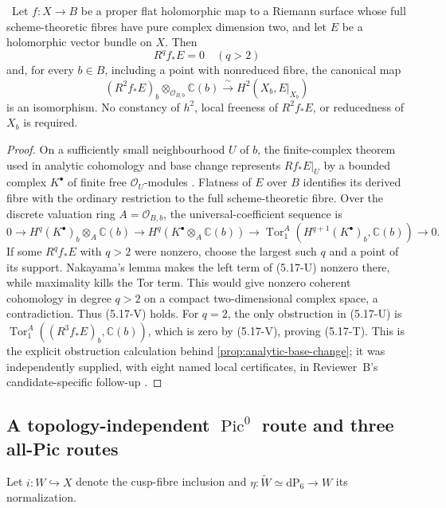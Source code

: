 \begin{corollary}
\label{cor:surface-top-base-change}
\Verified\ Let $f:X\to B$ be a proper flat holomorphic map to a Riemann
surface whose full scheme-theoretic fibres have pure complex dimension two,
and let $E$ be a holomorphic vector bundle on $X$.  Then
\[
 R^qf_*E=0\quad(q>2)
 \tag{5.17-V}
\]
and, for every $b\in B$, including a point with nonreduced fibre, the
canonical map
\[
 (R^2f_*E)_b\otimes_{\mathcal O_{B,b}}\mathbb C(b)
 \xrightarrow{\ \sim\ }H^2(X_b,E|_{X_b})
 \tag{5.17-T}
\]
is an isomorphism.  No constancy of $h^2$, local freeness of $R^2f_*E$, or
reducedness of $X_b$ is required.
\end{corollary}

\begin{proof}
On a sufficiently small neighbourhood $U$ of $b$, the finite-complex theorem
used in analytic cohomology and base change represents $Rf_*E|_U$ by a
bounded complex $K^\bullet$ of finite free $\mathcal O_U$-modules
\cite[Chapter~III, \S3, Theorem~3.4]{BanicaStanasila1976}.  Flatness of
$E$ over $B$ identifies its derived fibre with the ordinary restriction to
the full scheme-theoretic fibre.  Over the discrete valuation ring
$A=\mathcal O_{B,b}$, the universal-coefficient sequence is
\[
0\longrightarrow H^q(K^\bullet)_b\otimes_A\mathbb C(b)
 \longrightarrow H^q(K^\bullet\otimes_A\mathbb C(b))
 \longrightarrow
 \operatorname{Tor}_1^A(H^{q+1}(K^\bullet)_b,\mathbb C(b))
 \longrightarrow0.
\tag{5.17-U}
\]
If some $R^qf_*E$ with $q>2$ were nonzero, choose the largest such $q$ and a
point of its support.  Nakayama's lemma makes the left term of (5.17-U)
nonzero there, while maximality kills the Tor term.  This would give nonzero
coherent cohomology in degree $q>2$ on a compact two-dimensional complex
space, a contradiction.  Thus (5.17-V) holds.  For $q=2$, the only
obstruction in (5.17-U) is
$\operatorname{Tor}_1^A((R^3f_*E)_b,\mathbb C(b))$, which is zero by
(5.17-V), proving (5.17-T).  This is the explicit obstruction calculation
behind \cref{prop:analytic-base-change}; it was independently supplied, with
eight named local certificates, in Reviewer~B's candidate-specific follow-up
\cite{ReviewerBValidation2026}.
\end{proof}

\subsection{A topology-independent \texorpdfstring{$\operatorname{Pic}^0$}{Pic0} route and three all-Pic routes}

Let $i:W\hookrightarrow X$ denote the cusp-fibre inclusion and
$\eta:\widetilde W\simeq\mathrm{dP}_6\to W$ its normalization.

